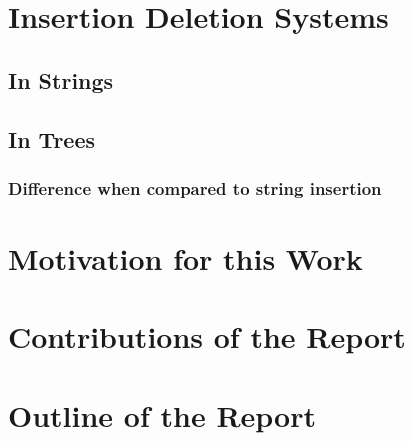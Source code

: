 \section{Insertion Deletion Systems}
\subsection{In Strings}
\subsection{In Trees}
\subsubsection{Difference when compared to string insertion}
\section{Motivation for this Work}
\section{Contributions of the Report}
\section{Outline of the Report}

